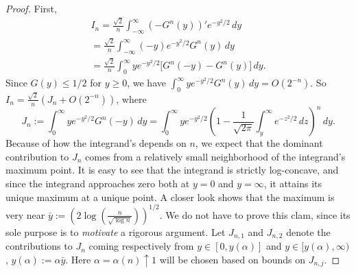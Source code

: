 \documentclass[11pt]{amsart}
\def\a{\alpha}
\theoremstyle{remark}
\numberwithin{equation}{section}
\begin{document}
\begin{proof} 
First,  
\begin{multline*}
I_{n}=\frac{\sqrt{2}}{n}
\int_{-\infty}^{\infty}(-G^n(y))' e^{-y^2/2}\,dy\\
=\frac{\sqrt{2}}{n}\int_{-\infty}^{\infty}(-y)e^{-y^2/2}G^{n}(y)\,dy\\
=\frac{\sqrt{2}}{n}\int_0^{\infty} ye^{-y^2/2}\bigl[G^{n}(-y)-G^{n}(y)\bigr]\,dy.
\end{multline*}
Since $G(y)\le 1/2$ for $y\ge 0$, we have $
\int_0^{\infty} ye^{-y^2/2}G^{n}(y)\,dy=O(2^{-n})$. So $I_n=\frac{\sqrt{2}}{n}(J_n+O(2^{-n}))$, where 
\[
J_n:=\int_0^{\infty}ye^{-y^2/2} G^{n}(-y)\,dy=\int_0^{\infty}ye^{-y^2/2}\left(1-\frac{1}{\sqrt{2\pi}}\int_y^{\infty}e^{-z^2/2}\,dz\right)^n\,dy.
\]
Because of how the integrand's depends on $n$, we expect that the dominant contribution to $J_n$ comes from a relatively small neighborhood of the integrand's maximum point. It is easy to see that the integrand is strictly log-concave, and since the integrand approaches zero both at $y=0$ and $y=\infty$, it attains its unique maximum at a unique point. A closer look shows that the maximum
is very near $\bar y:=\left(2\log\left(\frac{n}{\sqrt{\log n}}\right)\right)^{1/2}$. We do not have to prove this clam, since its sole purpose is to 
{\it motivate\/} a rigorous argument. 
Let $J_{n,1}$ and $J_{n,2}$ denote the contributions to $J_n$ coming respectively from $y\in [0,y(\a)]$ and $y\in [y(\a),\infty)$, $y(\a):=\a \bar y$. Here $\a=\a(n)\uparrow 1$ will be chosen based on bounds on $J_{n,j}$.


\end{proof}
\end{document}
